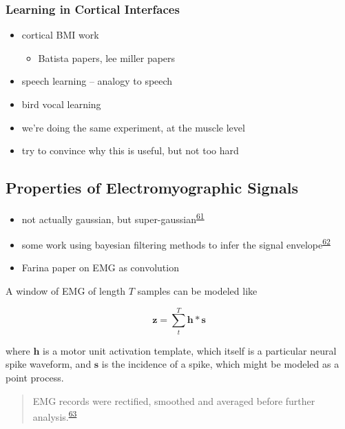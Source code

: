 \documentclass[
  a4paper,
]{article}
\providecommand{\tightlist}{%
  \setlength{\itemsep}{0pt}\setlength{\parskip}{0pt}}
\begin{document}
\hypertarget{learning-in-cortical-interfaces}{%
\subsubsection{Learning in Cortical
Interfaces}\label{learning-in-cortical-interfaces}}

\begin{itemize}
\item
  cortical BMI work

  \begin{itemize}
  \tightlist
  \item
    Batista papers, lee miller papers
  \end{itemize}
\item
  speech learning -- analogy to speech
\item
  bird vocal learning
\item
  we're doing the same experiment, at the muscle level
\item
  try to convince why this is useful, but not too hard
\end{itemize}

\hypertarget{properties-of-electromyographic-signals}{%
\subsection{Properties of Electromyographic
Signals}\label{properties-of-electromyographic-signals}}

\begin{itemize}
\tightlist
\item
  not actually gaussian, but
  super-gaussian\textsuperscript{\protect\hyperlink{ref-nazarpourNoteProbabilityDistribution2013}{61}}
\item
  some work using bayesian filtering methods to infer the signal
  envelope\textsuperscript{\protect\hyperlink{ref-sangerBayesianFilteringMyoelectric2007}{62}}
\item
  Farina paper on EMG as convolution
\end{itemize}

A window of EMG of length \(T\) samples can be modeled like

\[
\mathbf{z} = \sum_t^T \mathbf{h} * \mathbf{s}
\]

where \(\mathbf{h}\) is a motor unit activation template, which itself
is a particular neural spike waveform, and \(\mathbf{s}\) is the
incidence of a spike, which might be modeled as a point process.

\begin{quote}
EMG records were rectified, smoothed and averaged before further
analysis.\textsuperscript{\protect\hyperlink{ref-churchlandNeuralPopulationDynamics2012a}{63}}
\end{quote}
\end{document}
